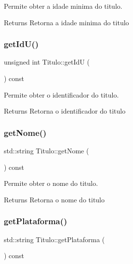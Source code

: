 Permite obter a idade minima do titulo. 

\begin{DoxyReturn}{Returns}
Retorna a idade minima do titulo 
\end{DoxyReturn}
\mbox{\label{class_titulo_af8fed6503c1c528ac3bfdbb182fce0b6}} 
\subsubsection{\texorpdfstring{get\+Id\+U()}{getIdU()}}
{\footnotesize\ttfamily unsigned int Titulo\+::get\+IdU (\begin{DoxyParamCaption}{ }\end{DoxyParamCaption}) const}



Permite obter o identificador do titulo. 

\begin{DoxyReturn}{Returns}
Retorna o identificador do titulo 
\end{DoxyReturn}
\mbox{\label{class_titulo_acb79279860b3404c6419697df5f860cb}} 
\subsubsection{\texorpdfstring{get\+Nome()}{getNome()}}
{\footnotesize\ttfamily std\+::string Titulo\+::get\+Nome (\begin{DoxyParamCaption}{ }\end{DoxyParamCaption}) const}



Permite obter o nome do titulo. 

\begin{DoxyReturn}{Returns}
Retorna o nome do titulo 
\end{DoxyReturn}
\mbox{\label{class_titulo_a2a57a31d40c5df012b3c6e2451c253dd}} 
\subsubsection{\texorpdfstring{get\+Plataforma()}{getPlataforma()}}
{\footnotesize\ttfamily std\+::string Titulo\+::get\+Plataforma (\begin{DoxyParamCaption}{ }\end{DoxyParamCaption}) const}




